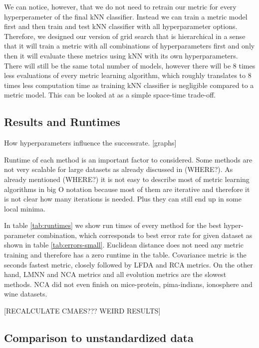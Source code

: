 \documentclass[12pt,a4paper]{report}
\begin{document}
We can notice, however, that we do not need to retrain our metric for every hyperperameter of the final kNN classifier. Instead we can train a metric model first and then train and test kNN classifier with all hyperparameter options. Therefore, we designed our version of grid search that is hierarchical in a sense that it will train a metric with all combinations of hyperparameters first and only then it will evaluate these metrics using kNN with its own hyperparameters. There will still be the same total number of models, however there will be 8 times less evaluations of every metric learning algorithm, which roughly translates to 8 times less computation time as training kNN classifier is negligible compared to a metric model. This can be looked at as a simple space-time trade-off.


\subsection{Results and Runtimes}

How hyperparameters influence the successrate. [graphs]



Runtime of each method is an important factor to considered. Some methods are not very scalable for large datasets as already discussed in (WHERE?). As already mentioned (WHERE?) it is not easy to describe most of metric learning algorithms in big O notation because most of them are iterative and therefore it is not clear how many iterations is needed. Plus they can still end up in some local minima.

In table \ref{tab:runtimes} we show run times of every method for the best hyper-parameter combination, which corresponds to best error rate for given dataset as shown in table \ref{tab:errors-small}. Euclidean distance does not need any metric training and therefore has a zero runtime in the table. Covariance metric is the seconds fastest metric, closely followed by LFDA and RCA metrics. On the other hand, LMNN and NCA metrics and all evolution metrics are the slowest methods. NCA did not even finish on mice-protein, pima-indians, ionosphere and wine datasets.

[RECALCULATE CMAES??? WEIRD RESULTS]


\subsection{Comparison to unstandardized data}
\end{document}

